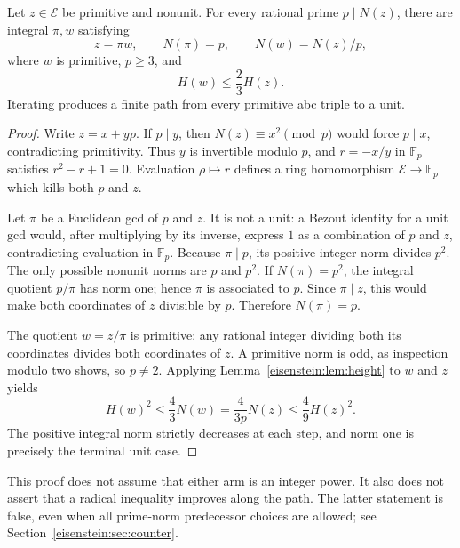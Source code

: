 \begin{theorem}\label{eisenstein:thm:coverage}
Let $z\in\mathcal E$ be primitive and nonunit. For every rational prime $p\mid N(z)$, there are integral $\pi,w$ satisfying
\begin{equation}\label{eisenstein:eq:descent}
z=\pi w,\qquad N(\pi)=p,\qquad N(w)=N(z)/p,
\end{equation}
where $w$ is primitive, $p\ge3$, and
\begin{equation}\label{eisenstein:eq:contraction}
H(w)\le\frac23 H(z).
\end{equation}
Iterating produces a finite path from every primitive abc triple to a unit.
\end{theorem}
\begin{proof}
Write $z=x+y\rho$. If $p\mid y$, then $N(z)\equiv x^2\pmod p$ would force $p\mid x$, contradicting primitivity. Thus $y$ is invertible modulo $p$, and $r=-x/y$ in $\mathbb F_p$ satisfies $r^2-r+1=0$. Evaluation $\rho\mapsto r$ defines a ring homomorphism $\mathcal E\to\mathbb F_p$ which kills both $p$ and $z$.

Let $\pi$ be a Euclidean gcd of $p$ and $z$. It is not a unit: a Bezout identity for a unit gcd would, after multiplying by its inverse, express $1$ as a combination of $p$ and $z$, contradicting evaluation in $\mathbb F_p$. Because $\pi\mid p$, its positive integer norm divides $p^2$. The only possible nonunit norms are $p$ and $p^2$. If $N(\pi)=p^2$, the integral quotient $p/\pi$ has norm one; hence $\pi$ is associated to $p$. Since $\pi\mid z$, this would make both coordinates of $z$ divisible by $p$. Therefore $N(\pi)=p$.

The quotient $w=z/\pi$ is primitive: any rational integer dividing both its coordinates divides both coordinates of $z$. A primitive norm is odd, as inspection modulo two shows, so $p\ne2$. Applying Lemma~\ref{eisenstein:lem:height} to $w$ and $z$ yields
\[
H(w)^2\le\frac43N(w)=\frac{4}{3p}N(z)\le\frac49H(z)^2.
\]
The positive integral norm strictly decreases at each step, and norm one is precisely the terminal unit case.
\end{proof}

This proof does not assume that either arm is an integer power. It also does not assert that a radical inequality improves along the path. The latter statement is false, even when all prime-norm predecessor choices are allowed; see Section~\ref{eisenstein:sec:counter}.

